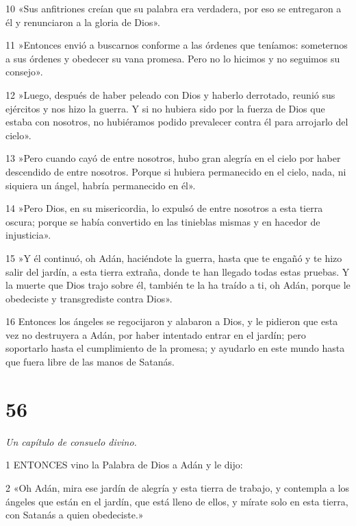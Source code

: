 \par 10 «Sus anfitriones creían que su palabra era verdadera, por eso se entregaron a él y renunciaron a la gloria de Dios».

\par 11 »Entonces envió a buscarnos conforme a las órdenes que teníamos: someternos a sus órdenes y obedecer su vana promesa. Pero no lo hicimos y no seguimos su consejo».

\par 12 »Luego, después de haber peleado con Dios y haberlo derrotado, reunió sus ejércitos y nos hizo la guerra. Y si no hubiera sido por la fuerza de Dios que estaba con nosotros, no hubiéramos podido prevalecer contra él para arrojarlo del cielo».

\par 13 »Pero cuando cayó de entre nosotros, hubo gran alegría en el cielo por haber descendido de entre nosotros. Porque si hubiera permanecido en el cielo, nada, ni siquiera un ángel, habría permanecido en él».

\par 14 »Pero Dios, en su misericordia, lo expulsó de entre nosotros a esta tierra oscura; porque se había convertido en las tinieblas mismas y en hacedor de injusticia».

\par 15 »Y él continuó, oh Adán, haciéndote la guerra, hasta que te engañó y te hizo salir del jardín, a esta tierra extraña, donde te han llegado todas estas pruebas. Y la muerte que Dios trajo sobre él, también te la ha traído a ti, oh Adán, porque le obedeciste y transgrediste contra Dios».

\par 16 Entonces los ángeles se regocijaron y alabaron a Dios, y le pidieron que esta vez no destruyera a Adán, por haber intentado entrar en el jardín; pero soportarlo hasta el cumplimiento de la promesa; y ayudarlo en este mundo hasta que fuera libre de las manos de Satanás.

\chapter{56}

\par \textit{Un capítulo de consuelo divino.}

\par 1 ENTONCES vino la Palabra de Dios a Adán y le dijo:

\par 2 «Oh Adán, mira ese jardín de alegría y esta tierra de trabajo, y contempla a los ángeles que están en el jardín, que está lleno de ellos, y mírate solo en esta tierra, con Satanás a quien obedeciste.»

